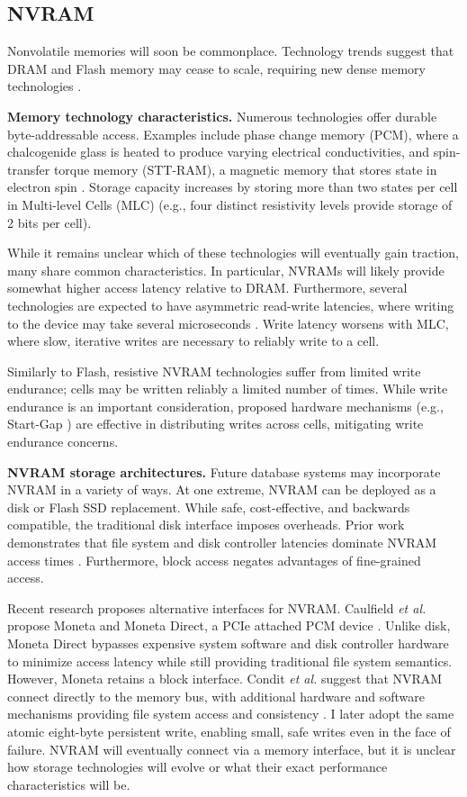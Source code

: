 \subsection{NVRAM}
\label{sec:Background:Storage:NVRAM}

Nonvolatile memories will soon be commonplace.
Technology trends suggest that DRAM and Flash memory may cease to scale, requiring new dense memory technologies \cite{LeeIpek09}.

\textbf{Memory technology characteristics.}
Numerous technologies offer durable byte-addressable access.
Examples include phase change memory (PCM), where a chalcogenide glass is heated to produce varying electrical conductivities, and spin-transfer torque memory (STT-RAM), a magnetic memory that stores state in electron spin \cite{BurrKurdi08}.
Storage capacity increases by storing more than two states per cell in Multi-level Cells (MLC) (e.g., four distinct resistivity levels provide storage of 2 bits per cell).

While it remains unclear which of these technologies will eventually gain traction, many share common characteristics.
In particular, NVRAMs will likely provide somewhat higher access latency relative to DRAM.
Furthermore, several technologies are expected to have asymmetric read-write latencies, where writing to the device may take several microseconds \cite{QureshiSrinivasan09}.
Write latency worsens with MLC, where slow, iterative writes are necessary to reliably write to a cell.

Similarly to Flash, resistive NVRAM technologies suffer from limited write endurance; cells may be written reliably a limited number of times.
While write endurance is an important consideration, proposed hardware mechanisms (e.g., Start-Gap \cite{QureshiKaridis09}) are effective in distributing writes across cells, mitigating write endurance concerns.

\textbf{NVRAM storage architectures.}
Future database systems may incorporate NVRAM in a variety of ways.
At one extreme, NVRAM can be deployed as a disk or Flash SSD replacement.
While safe, cost-effective, and backwards compatible, the traditional disk interface imposes overheads.
Prior work demonstrates that file system and disk controller latencies dominate NVRAM access times \cite{CaulfieldDe10}.
Furthermore, block access negates advantages of fine-grained access.

Recent research proposes alternative interfaces for NVRAM.
Caulfield \emph{et al.} propose Moneta and Moneta Direct, a PCIe attached PCM device \cite{CaulfieldMollov12}.
Unlike disk, Moneta Direct bypasses expensive system software and disk controller hardware to minimize access latency while still providing traditional file system semantics.
However, Moneta retains a block interface.
Condit \emph{et al.} suggest that NVRAM connect directly to the memory bus, with additional hardware and software mechanisms providing file system access and consistency \cite{ConditNightingale09}.
I later adopt the same atomic eight-byte persistent write, enabling small, safe writes even in the face of failure.
NVRAM will eventually connect via a memory interface, but it is unclear how storage technologies will evolve or what their exact performance characteristics will be.

